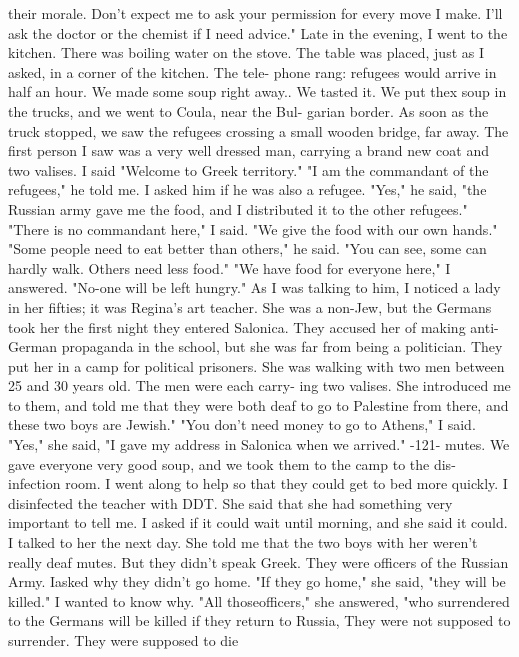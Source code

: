 their morale. Don't expect me to ask your permission for every move I make. I'll 
ask the doctor or the chemist if I need advice." 
Late in the evening, I went to the kitchen. There was boiling water on the 
stove. The table was placed, just as I asked, in a corner of the kitchen. The tele-
phone rang: refugees would arrive in half an hour. We made some soup right away.. 
We tasted it. We put thex soup in the trucks, and we went to Coula, near the Bul-
garian border. 
As soon as the truck stopped, we saw the refugees crossing a small wooden bridge, 
far away. The first person I saw was a very well dressed man, carrying a brand new 
coat and two valises. I said "Welcome to Greek territory." 
"I am the commandant of the refugees," he told me. I asked him if he was also a 
refugee. "Yes," he said, "the Russian army gave me the food, and I distributed it to 
the other refugees." 
"There is no commandant here," I said. "We give the food with our own hands." 
"Some people need to eat better than others," he said. "You can see, some can 
hardly walk. Others need less food." 
"We have food for everyone here," I answered. "No-one will be left hungry." 
As I was talking to him, I noticed a lady in her fifties; it was Regina's art 
teacher. She was a non-Jew, but the Germans took her the first night they entered 
Salonica. They accused her of making anti-German propaganda in the school, but she 
was far from being a politician. They put her in a camp for political prisoners. 
She was walking with two men between 25 and 30 years old. The men were each carry-
ing two valises. She introduced me to them, and told me that they were both deaf 
to go to Palestine from there, and these two boys are Jewish." 
"You don't need money to go to Athens," I said. 
"Yes," she said, "I gave my address in Salonica when we arrived." 
-121- 
mutes. We gave everyone very good soup, and we took them to the camp to the dis-
infection room. I went along to help so that they could get to bed more quickly. 
I disinfected the teacher with DDT. She said that she had something very important 
to tell me. I asked if it could wait until morning, and she said it could. 
I talked to her the next day. She told me that the two boys with her weren't 
really deaf mutes. But they didn't speak Greek. They were officers of the Russian 
Army. Iasked why they didn't go home. 
"If they go home," she said, "they will be killed." I wanted to know why. "All 
thoseofficers," she answered, "who surrendered to the Germans will be killed if they 
return to Russia, They were not supposed to surrender. They were supposed to die 
